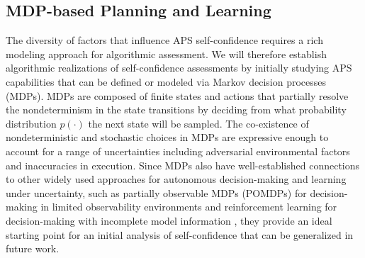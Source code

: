 
\subsection{MDP-based Planning and Learning}
The diversity of factors that influence APS self-confidence requires a rich modeling approach for algorithmic assessment. We will therefore establish algorithmic realizations of self-confidence assessments by initially studying APS capabilities that can be defined or modeled via Markov decision processes (MDPs). MDPs are composed of finite states and actions that partially resolve the nondeterminism in the state transitions by deciding from what probability distribution $p(\cdot)$ the next state will be sampled. The co-existence of nondeterministic and stochastic choices in MDPs are expressive enough to account for a range of uncertainties including adversarial environmental factors and inaccuracies in execution. %
Since MDPs also have well-established connections to other widely used approaches for autonomous decision-making and learning under uncertainty, such as partially observable MDPs (POMDPs) for decision-making in limited observability environments and reinforcement learning for decision-making with incomplete model information \cite{Kochenderfer2015-uu}, they provide an ideal starting point for an initial analysis of self-confidence that can be generalized in future work. 

